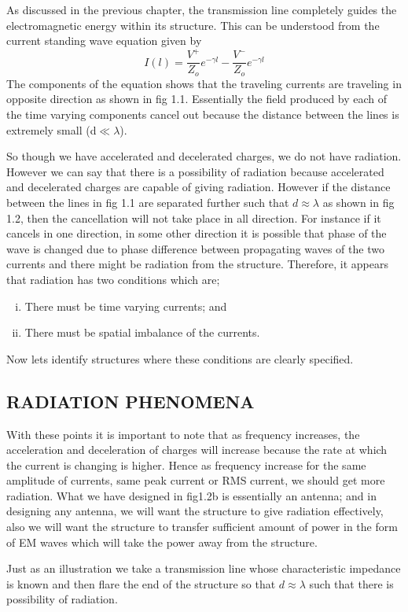 As discussed in the previous chapter, the transmission line completely guides the electromagnetic energy within its structure. This can be understood from the current standing wave equation given by
$$I(l)=\dfrac{V^+}{Z_o}e^{-\gamma l} - \dfrac{V^-}{Z_o}e^{-\gamma l}$$
The components of the equation shows that the traveling currents are traveling in opposite direction as shown in fig 1.1. Essentially the field produced by each of the time varying components cancel out because the distance between the lines is extremely small (d$\ll\lambda$). 

So though we have accelerated and decelerated charges, we do not have radiation. However we can say that there is a possibility of radiation because accelerated and decelerated charges are capable of giving radiation. However if the distance between the lines in fig 1.1 are separated further such that $d\approx\lambda$ as shown in fig 1.2, then the cancellation will not take place in all direction. For instance if it cancels in one direction, in some other direction it is possible that phase of the wave is changed due to phase difference between propagating waves of the two currents and there might be radiation from the structure.
Therefore, it appears that radiation has two conditions which are; 
\begin{enumerate}[(i)]
\item There must be time varying currents; and
\item There must be spatial imbalance of the currents.
\end{enumerate}
Now lets identify structures where these conditions are clearly specified.

\subsection{RADIATION PHENOMENA}
With these points it is important to note that as frequency increases, the acceleration and deceleration of charges will increase because the rate at which the current is changing is higher. Hence as frequency increase for the same amplitude of currents, same peak current or RMS current, we should get more radiation. What we have designed in fig1.2b is essentially an antenna; and in designing any antenna, we will want the structure to give radiation effectively, also we will want the structure to transfer sufficient amount of power in the form of EM waves which will take the power away from the structure.

Just as an illustration we take a transmission line whose characteristic impedance is known and then flare the end of the structure so that $d\approx\lambda$ such that there is possibility of radiation.

